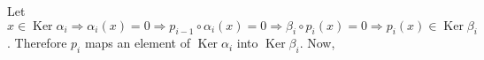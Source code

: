 \documentclass[11pt]{amsart}
\DeclareMathOperator{\im}{\text{Im}}
\DeclareMathOperator{\Ker}{\text{Ker}}
\begin{document}
Let $x\in\Ker\alpha_i \Rightarrow \alpha_i(x)=0 \Rightarrow p_{i-1}\circ \alpha_i(x)=0 \Rightarrow \beta_i\circ p_i(x)=0 \Rightarrow p_i(x)\in\Ker\beta_i$. Therefore $p_i$ maps an element of $\Ker\alpha_i$ into $\Ker\beta_i$. Now,

\begin{center}


\end{center}
\end{document}

